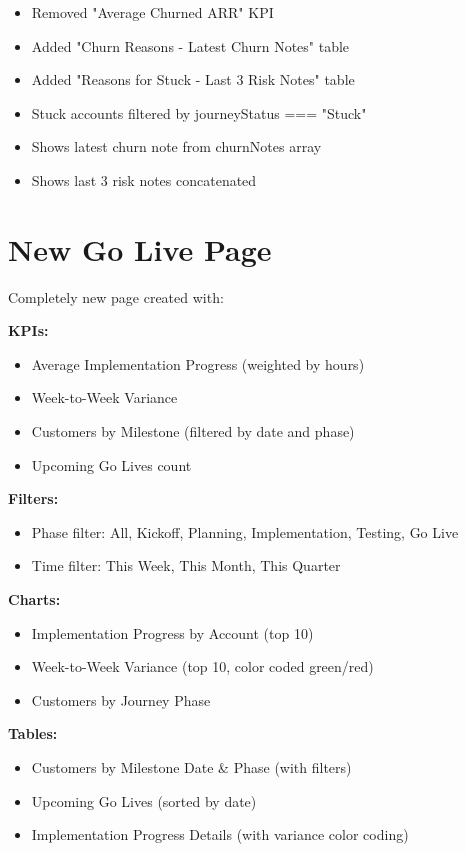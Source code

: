 \documentclass[12pt,a4paper]{article}
\begin{document}
\begin{itemize}[leftmargin=*]
    \item Removed "Average Churned ARR" KPI
    \item Added "Churn Reasons - Latest Churn Notes" table
    \item Added "Reasons for Stuck - Last 3 Risk Notes" table
    \item Stuck accounts filtered by journeyStatus === "Stuck"
    \item Shows latest churn note from churnNotes array
    \item Shows last 3 risk notes concatenated
\end{itemize}

\section*{New Go Live Page}

Completely new page created with:

\textbf{KPIs:}
\begin{itemize}[leftmargin=*]
    \item Average Implementation Progress (weighted by hours)
    \item Week-to-Week Variance
    \item Customers by Milestone (filtered by date and phase)
    \item Upcoming Go Lives count
\end{itemize}

\textbf{Filters:}
\begin{itemize}[leftmargin=*]
    \item Phase filter: All, Kickoff, Planning, Implementation, Testing, Go Live
    \item Time filter: This Week, This Month, This Quarter
\end{itemize}

\textbf{Charts:}
\begin{itemize}[leftmargin=*]
    \item Implementation Progress by Account (top 10)
    \item Week-to-Week Variance (top 10, color coded green/red)
    \item Customers by Journey Phase
\end{itemize}

\textbf{Tables:}
\begin{itemize}[leftmargin=*]
    \item Customers by Milestone Date \& Phase (with filters)
    \item Upcoming Go Lives (sorted by date)
    \item Implementation Progress Details (with variance color coding)
\end{itemize}
\end{document}
